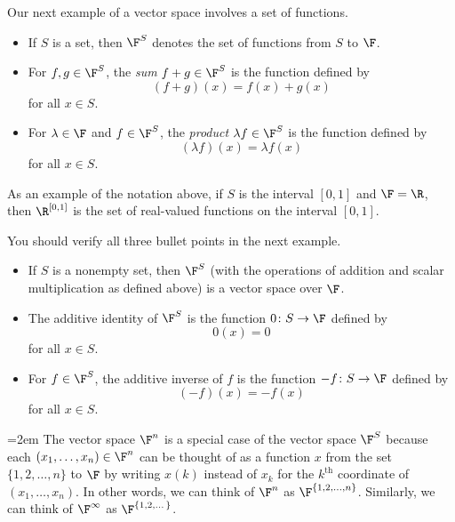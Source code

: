 Our next example of a vector space involves a set of functions.

\begin{notation}[$\F^S$]\label{ax:1.24}\leavevmode
\begin{itemize}
\item If $S$ is a set, then $\F^S$ denotes the set of functions from $S$ to
  $\F$.
\item For $f,g\in\F^S$, the \emph{sum} $f+g\in\F^S$ is the function defined by
  \[ (f+g)(x) = f(x)+g(x) \]
  for all $x\in S$.
\item For $\lambda\in\F$ and $f\in\F^S$, the \emph{product} $\lambda f\in\F^S$
  is the function defined by
  \[ (\lambda f)(x) = \lambda f(x) \]
  for all $x\in S$.
\end{itemize}
\end{notation}

As an example of the notation above, if $S$ is the interval $[0,1]$ and
$\F=\R$, then $\R^{[0,1]}$ is the set of real-valued functions on the interval
$[0,1]$.

You should verify all three bullet points in the next example.

\begin{example}\label{ax:1.25}\leavevmode
\begin{itemize}
\item If $S$ is a nonempty set, then $\F^S$ (with the operations of addition
  and scalar multiplication as defined above) is a vector space over $\F$.
\item The additive identity of $\F^S$ is the function $0\colon S\to\F$ defined
  by
  \[ 0(x) = 0 \]
  for all $x\in S$.
\item For $f\in\F^S$, the additive inverse of $f$ is the function
  $-f\colon S\to\F$ defined by
  \[ (-f)(x) = -f(x) \]
  for all $x\in S$.
\end{itemize}
\end{example}

%
{\emergencystretch=2em
The vector space $\F^n$ is a special case of the vector space $\F^S$ because
each $(x_1,\dots,x_n)\in\F^n$ can be thought of as a function $x$ from the set
$\{1,2,\dots,n\}$ to $\F$ by writing $x(k)$ instead of $x_k$ for the
$k^{\text{th}}$ coordinate of $(x_1,\dots,x_n)$. In other words, we can think
of $\F^n$ as $\F^{\{1,2,\dots,n\}}$. Similarly, we can think of $\F^\infty$ as
$\F^{\{1,2,\dots\}}$.\par}


